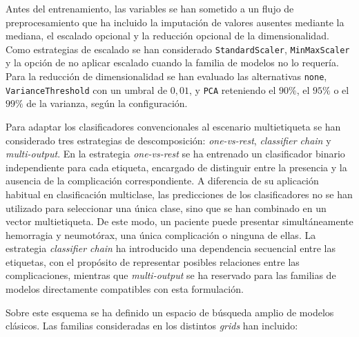 Antes del entrenamiento, las variables se han sometido a un flujo de preprocesamiento que ha incluido la imputación de valores ausentes mediante la mediana, el escalado opcional y la reducción opcional de la dimensionalidad. Como estrategias de escalado se han considerado \texttt{StandardScaler}, \texttt{MinMaxScaler} y la opción de no aplicar escalado cuando la familia de modelos no lo requería. Para la reducción de dimensionalidad se han evaluado las alternativas \texttt{none}, \texttt{VarianceThreshold} con un umbral de \(0{,}01\), y \texttt{PCA} reteniendo el \(90\%\), el \(95\%\) o el \(99\%\) de la varianza, según la configuración.


Para adaptar los clasificadores convencionales al escenario multietiqueta se han considerado tres estrategias de descomposición: \textit{one-vs-rest}, \textit{classifier chain} y \textit{multi-output}. En la estrategia \textit{one-vs-rest} se ha entrenado un clasificador binario independiente para cada etiqueta, encargado de distinguir entre la presencia y la ausencia de la complicación correspondiente. A diferencia de su aplicación habitual en clasificación multiclase, las predicciones de los clasificadores no se han utilizado para seleccionar una única clase, sino que se han combinado en un vector multietiqueta. De este modo, un paciente puede presentar simultáneamente hemorragia y neumotórax, una única complicación o ninguna de ellas. La estrategia \textit{classifier chain} ha introducido una dependencia secuencial entre las etiquetas, con el propósito de representar posibles relaciones entre las complicaciones, mientras que \textit{multi-output} se ha reservado para las familias de modelos directamente compatibles con esta formulación.

Sobre este esquema se ha definido un espacio de búsqueda amplio de modelos clásicos. Las familias consideradas en los distintos \textit{grids} han incluido:


